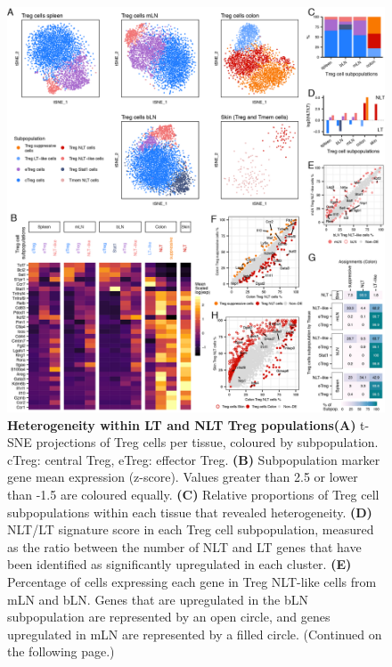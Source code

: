 \begin{figure}[tp!] 
\centering    
\includegraphics[width=1.0\textwidth]{Chapter2/Figs/chap2_fig2.png} %
\caption[Heterogeneity within LT and NLT Treg populations]{\textbf{Heterogeneity within LT and NLT Treg populations}\newline\textbf{(A)} t-SNE projections of Treg cells per tissue, coloured by subpopulation. cTreg: central Treg, eTreg: effector Treg. \textbf{(B)} Subpopulation marker gene mean expression (z-score). Values greater than 2.5 or lower than -1.5 are coloured equally. \textbf{(C)} Relative proportions of Treg cell subpopulations within each tissue that revealed heterogeneity. \textbf{(D)} NLT/LT signature score in each Treg cell subpopulation, measured as the ratio between the number of NLT and LT genes that have been identified as significantly upregulated in each cluster. \textbf{(E)} Percentage of cells expressing each gene in Treg NLT-like cells from mLN and bLN. Genes that are upregulated in the bLN subpopulation are represented by an open circle, and genes upregulated in mLN are represented by a filled circle. (Continued on the following page.)}
\label{fig:chap2_fig2}
\end{figure}
\begin{figure}[t]
\end{figure}

